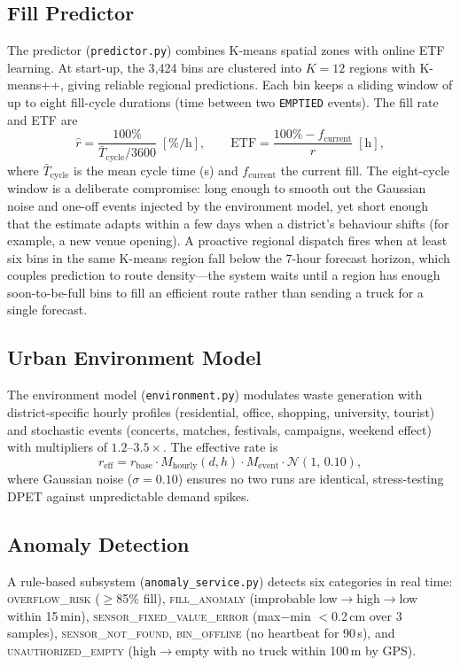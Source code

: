 \documentclass[conference, a4paper]{IEEEtran}
\begin{document}
\subsection{Fill Predictor}
The predictor (\texttt{predictor.py}) combines K-means spatial zones with online ETF learning. At start-up, the 3{,}424 bins are clustered into $K=12$ regions with K-means++, giving reliable regional predictions. Each bin keeps a sliding window of up to eight fill-cycle durations (time between two \texttt{EMPTIED} events). The fill rate and ETF are
\begin{equation}
  \hat{r} = \frac{100\%}{\bar{T}_{\text{cycle}}/3600}\;[\%/\text{h}], \qquad
  \text{ETF} = \frac{100\% - f_{\text{current}}}{\hat{r}}\;[\text{h}],
  \label{eq:etf}
\end{equation}
where $\bar{T}_{\text{cycle}}$ is the mean cycle time (s) and $f_{\text{current}}$ the current fill. The eight-cycle window is a deliberate compromise: long enough to smooth out the Gaussian noise and one-off events injected by the environment model, yet short enough that the estimate adapts within a few days when a district's behaviour shifts (for example, a new venue opening). A proactive regional dispatch fires when at least six bins in the same K-means region fall below the 7-hour forecast horizon, which couples prediction to route density---the system waits until a region has enough soon-to-be-full bins to fill an efficient route rather than sending a truck for a single forecast.

\subsection{Urban Environment Model}
The environment model (\texttt{environment.py}) modulates waste generation with district-specific hourly profiles (residential, office, shopping, university, tourist) and stochastic events (concerts, matches, festivals, campaigns, weekend effect) with multipliers of $1.2$--$3.5\times$. The effective rate is
\begin{equation}
  r_{\text{eff}} = r_{\text{base}}\cdot M_{\text{hourly}}(d,h)\cdot M_{\text{event}}\cdot \mathcal{N}(1,\,0.10),
  \label{eq:eff_rate}
\end{equation}
where Gaussian noise ($\sigma=0.10$) ensures no two runs are identical, stress-testing DPET against unpredictable demand spikes.

\subsection{Anomaly Detection}
A rule-based subsystem (\texttt{anomaly\_service.py}) detects six categories in real time: \textsc{overflow\_risk} ($\geq$85\% fill), \textsc{fill\_anomaly} (improbable low$\to$high$\to$low within 15\,min), \textsc{sensor\_fixed\_value\_error} (max$-$min $<$0.2\,cm over 3 samples), \textsc{sensor\_not\_found}, \textsc{bin\_offline} (no heartbeat for 90\,s), and \textsc{unauthorized\_empty} (high$\to$empty with no truck within 100\,m by GPS).
\end{document}
